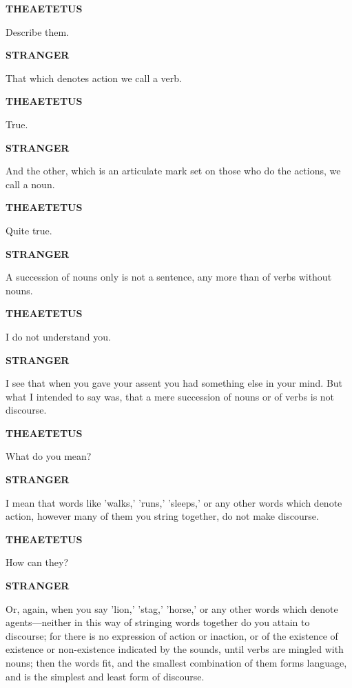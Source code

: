 \documentclass[11pt,letter]{article}
\begin{document}
\par \textbf{THEAETETUS}
\par   Describe them.

\par \textbf{STRANGER}
\par   That which denotes action we call a verb.

\par \textbf{THEAETETUS}
\par   True.

\par \textbf{STRANGER}
\par   And the other, which is an articulate mark set on those who do the actions, we call a noun.

\par \textbf{THEAETETUS}
\par   Quite true.

\par \textbf{STRANGER}
\par   A succession of nouns only is not a sentence, any more than of verbs without nouns.

\par \textbf{THEAETETUS}
\par   I do not understand you.

\par \textbf{STRANGER}
\par   I see that when you gave your assent you had something else in your mind. But what I intended to say was, that a mere succession of nouns or of verbs is not discourse.

\par \textbf{THEAETETUS}
\par   What do you mean?

\par \textbf{STRANGER}
\par   I mean that words like 'walks,' 'runs,' 'sleeps,' or any other words which denote action, however many of them you string together, do not make discourse.

\par \textbf{THEAETETUS}
\par   How can they?

\par \textbf{STRANGER}
\par   Or, again, when you say 'lion,' 'stag,' 'horse,' or any other words which denote agents—neither in this way of stringing words together do you attain to discourse; for there is no expression of action or inaction, or of the existence of existence or non-existence indicated by the sounds, until verbs are mingled with nouns; then the words fit, and the smallest combination of them forms language, and is the simplest and least form of discourse.
\end{document}

